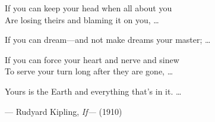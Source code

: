 \cleardoublepage
\thispagestyle{empty}

\vspace*{\fill}

\begin{flushright}
\begin{minipage}{0.58\textwidth}
\itshape

If you can keep your head when all about you\\
Are losing theirs and blaming it on you, \ldots

\vspace{0.8em}

If you can dream---and not make dreams your master; \ldots

\vspace{0.8em}

If you can force your heart and nerve and sinew\\
To serve your turn long after they are gone, \ldots

\vspace{0.8em}

Yours is the Earth and everything that's in it. \ldots

\vspace{1.5em}

\raggedleft
--- Rudyard Kipling, \textit{If---} (1910)
\end{minipage}
\end{flushright}

\vspace*{\fill}

\cleardoublepage
